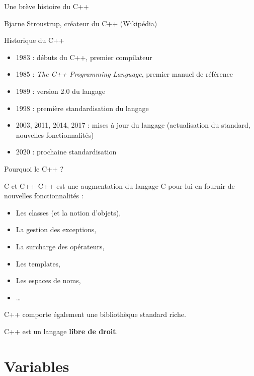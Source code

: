 \begin{frame}{Une brève histoire du C++}
\begin{minipage}{0.33\textwidth}
  {\footnotesize Bjarne Stroustrup, créateur du C++ (\href{https://fr.wikipedia.org/wiki/Bjarne_Stroustrup}{Wikipédia})}
\end{minipage}%
\begin{minipage}{0.65\textwidth}
\begin{block}{Historique du C++}
  \begin{itemize}
    \item 1983 : débuts du C++, premier compilateur
    \item 1985 : \emph{The C++ Programming Language}, premier manuel de référence
    \item 1989 : version 2.0 du langage
    \item 1998 : première standardisation du langage
    \item 2003, 2011, 2014, 2017 : mises à jour du langage (actualisation du standard, nouvelles fonctionnalités)
    \item 2020 : prochaine standardisation 
  \end{itemize}
\end{block}
\end{minipage}
\end{frame}

\begin{frame}{Pourquoi le C++ ?}

\begin{block}{C et C++}
C++ est une augmentation du langage C pour lui en fournir de nouvelles fonctionnalités :
\begin{itemize}
  \item Les classes (et la notion d'objets),
  \item La gestion des exceptions,
  \item La surcharge des opérateurs,
  \item Les templates,
  \item Les espaces de noms,
  \item \dots
\end{itemize}
\end{block}

C++ comporte également une bibliothèque standard riche.

C++ est un langage \textbf{libre de droit}.
\end{frame}

\section{Variables}

